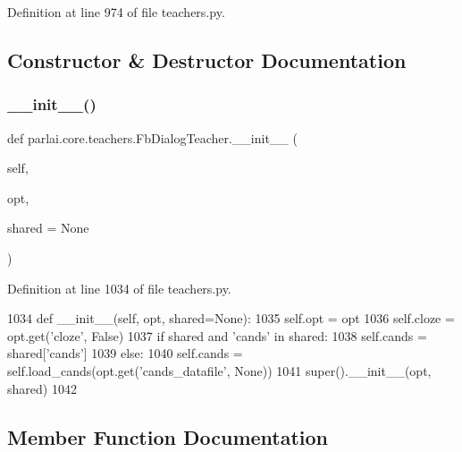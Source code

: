 Definition at line 974 of file teachers.\+py.



\subsection{Constructor \& Destructor Documentation}
\mbox{\label{classparlai_1_1core_1_1teachers_1_1FbDialogTeacher_a52316baa31ca0881d4cd98ec2fbebad5}} 
\subsubsection{\texorpdfstring{\+\_\+\+\_\+init\+\_\+\+\_\+()}{\_\_init\_\_()}}
{\footnotesize\ttfamily def parlai.\+core.\+teachers.\+Fb\+Dialog\+Teacher.\+\_\+\+\_\+init\+\_\+\+\_\+ (\begin{DoxyParamCaption}\item[{}]{self,  }\item[{}]{opt,  }\item[{}]{shared = {\ttfamily None} }\end{DoxyParamCaption})}



Definition at line 1034 of file teachers.\+py.


\begin{DoxyCode}
1034     \textcolor{keyword}{def }\_\_init\_\_(self, opt, shared=None):
1035         self.opt = opt
1036         self.cloze = opt.get(\textcolor{stringliteral}{'cloze'}, \textcolor{keyword}{False})
1037         \textcolor{keywordflow}{if} shared \textcolor{keywordflow}{and} \textcolor{stringliteral}{'cands'} \textcolor{keywordflow}{in} shared:
1038             self.cands = shared[\textcolor{stringliteral}{'cands'}]
1039         \textcolor{keywordflow}{else}:
1040             self.cands = self.load\_cands(opt.get(\textcolor{stringliteral}{'cands\_datafile'}, \textcolor{keywordtype}{None}))
1041         super().\_\_init\_\_(opt, shared)
1042 
\end{DoxyCode}


\subsection{Member Function Documentation}
\mbox{\label{classparlai_1_1core_1_1teachers_1_1FbDialogTeacher_ab3ff2f1a0707aae7bf888fb13ec49641}} 
